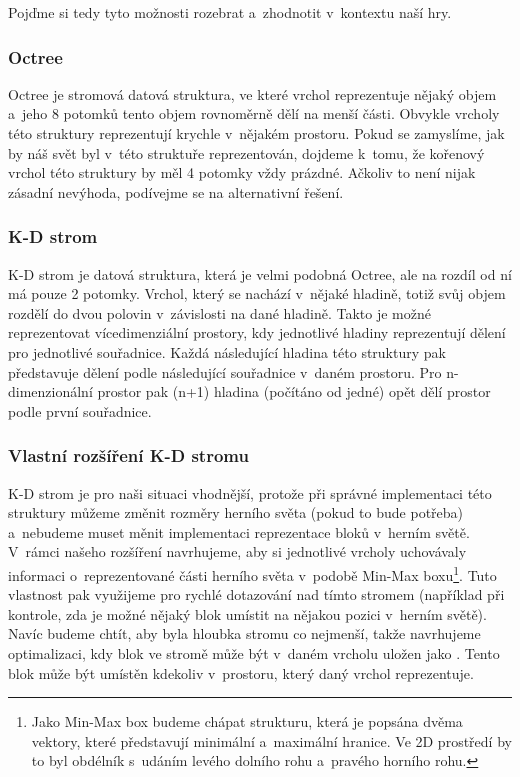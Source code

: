 Pojďme si tedy tyto možnosti rozebrat a~zhodnotit v~kontextu naší hry.

\subsubsection{Octree}
Octree je stromová datová struktura, ve které vrchol reprezentuje nějaký objem a~jeho 8 potomků tento objem rovnoměrně dělí na menší části. Obvykle vrcholy této struktury reprezentují krychle v~nějakém prostoru. Pokud se zamyslíme, jak by náš svět byl v~této struktuře reprezentován, dojdeme k~tomu, že kořenový vrchol této struktury by měl 4 potomky vždy prázdné. Ačkoliv to není nijak zásadní nevýhoda, podívejme se na alternativní řešení.

\subsubsection{K-D strom}
K-D strom je datová struktura, která je velmi podobná Octree, ale na rozdíl od ní má pouze 2 potomky. Vrchol, který se nachází v~nějaké hladině, totiž svůj objem rozdělí do dvou polovin v~závislosti na dané hladině. Takto je možné reprezentovat vícedimenziální prostory, kdy jednotlivé hladiny reprezentují dělení pro jednotlivé souřadnice. Každá následující hladina této struktury pak představuje dělení podle následující souřadnice v~daném prostoru. Pro n-dimenzionální prostor pak (n+1) hladina (počítáno od jedné) opět dělí prostor podle první souřadnice.

\subsubsection{Vlastní rozšíření K-D stromu}
K-D strom je pro naši situaci vhodnější, protože při správné implementaci této struktury můžeme změnit rozměry herního světa (pokud to bude potřeba) a~nebudeme muset měnit implementaci reprezentace bloků v~herním světě. V~rámci našeho rozšíření navrhujeme, aby si jednotlivé vrcholy uchovávaly informaci o~reprezentované části herního světa v~podobě Min-Max boxu\footnote{Jako Min-Max box budeme chápat strukturu, která je popsána dvěma vektory, které představují minimální a~maximální hranice. Ve 2D prostředí by to byl obdélník s~udáním levého dolního rohu a~pravého horního rohu.}. Tuto vlastnost pak využijeme pro rychlé dotazování nad tímto stromem (například při kontrole, zda je možné nějaký blok umístit na nějakou pozici v~herním světě). Navíc budeme chtít, aby byla hloubka stromu co nejmenší, takže navrhujeme optimalizaci, kdy blok ve stromě může být v~daném vrcholu uložen jako . Tento blok může být umístěn kdekoliv v~prostoru, který daný vrchol reprezentuje. 

